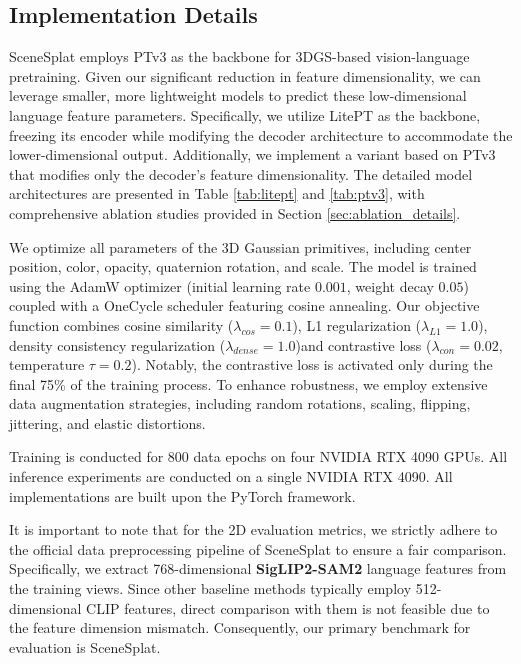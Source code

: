 \subsection{Implementation Details}
SceneSplat employs PTv3 \cite{wu2024ptv3} as the backbone for 3DGS-based vision-language pretraining. Given our significant reduction in feature dimensionality, we can leverage smaller, more lightweight models to predict these low-dimensional language feature parameters. Specifically, we utilize LitePT \cite{yuelitept2026} as the backbone, freezing its encoder while modifying the decoder architecture to accommodate the lower-dimensional output. Additionally, we implement a variant based on PTv3 that modifies only the decoder's feature dimensionality. The detailed model architectures are presented in Table \ref{tab:litept} and \ref{tab:ptv3}, with comprehensive ablation studies provided in Section \ref{sec:ablation_details}.

We optimize all parameters of the 3D Gaussian primitives, including center position, color, opacity, quaternion rotation, and scale. The model is trained using the AdamW optimizer (initial learning rate $0.001$, weight decay $0.05$) coupled with a OneCycle scheduler featuring cosine annealing. Our objective function combines cosine similarity ($\lambda_{cos}=0.1$), L1 regularization ($\lambda_{L1}=1.0$), density consistency regularization ($\lambda_{dense}=1.0$)and contrastive loss ($\lambda_{con}=0.02$, temperature $\tau=0.2$). Notably, the contrastive loss is activated only during the final 75\% of the training process. To enhance robustness, we employ extensive data augmentation strategies, including random rotations, scaling, flipping, jittering, and elastic distortions.

Training is conducted for 800 data epochs on four NVIDIA RTX 4090 GPUs. All inference experiments are conducted on a single NVIDIA RTX 4090. All implementations are built upon the PyTorch framework.

It is important to note that for the 2D evaluation metrics, we strictly adhere to the official data preprocessing pipeline of SceneSplat to ensure a fair comparison. Specifically, we extract 768-dimensional \textbf{SigLIP2-SAM2} language features from the training views. Since other baseline methods typically employ 512-dimensional CLIP features, direct comparison with them is not feasible due to the feature dimension mismatch. Consequently, our primary benchmark for evaluation is SceneSplat.

